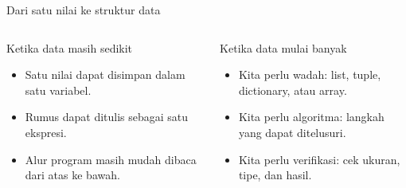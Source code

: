 \documentclass[aspectratio=169,11pt]{beamer}
\begin{document}
\begin{frame}{Dari satu nilai ke struktur data}
\begin{columns}[T]
\begin{block}{Ketika data masih sedikit}
\begin{itemize}
  \item Satu nilai dapat disimpan dalam satu variabel.
  \item Rumus dapat ditulis sebagai satu ekspresi.
  \item Alur program masih mudah dibaca dari atas ke bawah.
\end{itemize}
\end{block}
\begin{block}{Ketika data mulai banyak}
\begin{itemize}
  \item Kita perlu wadah: list, tuple, dictionary, atau array.
  \item Kita perlu algoritma: langkah yang dapat ditelusuri.
  \item Kita perlu verifikasi: cek ukuran, tipe, dan hasil.
\end{itemize}
\end{block}
\end{columns}
\vspace{3mm}
\begin{center}
\end{center}
\end{frame}
\end{document}

